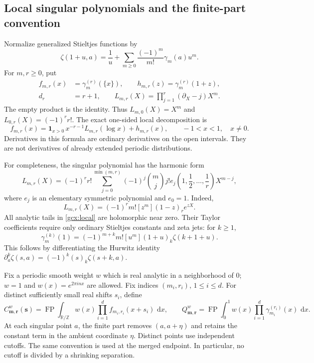 \documentclass[11pt]{article}
\numberwithin{equation}{section}
\theoremstyle{plain}
\theoremstyle{definition}
\theoremstyle{remark}
\DeclareMathOperator{\FP}{FP}
\newcommand{\R}{\mathbb R}
\newcommand{\Z}{\mathbb Z}
\newcommand{\dd}{\,\mathrm d}
\begin{document}
\subsection{Local singular polynomials and the finite-part convention}

Normalize generalized Stieltjes functions by
\[
 \zeta(1+u,a)=\frac1u+
       \sum_{m\ge0}\frac{(-1)^m}{m!}\gamma_m(a)u^m.
\]
For $m,r\ge0$, put
\begin{align}
 f_{m,r}(x)&=\gamma_m^{(r)}(\{x\}),\qquad
 h_{m,r}(z)=\gamma_m^{(r)}(1+z),\label{gcx:fg}\\
 d_r&=r+1,\qquad
 L_{m,r}(X)=\prod_{j=1}^{r}(\partial_X-j)X^m.
 \label{gcx:sing-polynomial}
\end{align}
The empty product is the identity.  Thus $L_{m,0}(X)=X^m$ and
$L_{0,r}(X)=(-1)^r r!$.  The exact one-sided local decomposition is
\begin{equation}\label{gcx:local}
 f_{m,r}(x)=\boldsymbol 1_{x>0}\,
              x^{-r-1}L_{m,r}(\log x)+h_{m,r}(x),
 \qquad -1<x<1,\quad x\ne0.
\end{equation}
Derivatives in this formula are ordinary derivatives on the open
intervals.  They are not derivatives of already extended periodic
distributions.

For completeness, the singular polynomial has the harmonic form
\begin{equation}\label{gcx:harmonic-poly}
 L_{m,r}(X)=(-1)^r r!
 \sum_{j=0}^{\min(m,r)}(-1)^j\binom mj j!
 e_j\left(1,\frac12,\ldots,\frac1r\right)X^{m-j},
\end{equation}
where $e_j$ is an elementary symmetric polynomial and $e_0=1$.
Indeed,
\[
 L_{m,r}(X)=(-1)^r m![z^m](1-z)_r e^{zX}.
\]
All analytic tails in \eqref{gcx:local} are holomorphic near zero.  Their
Taylor coefficients require only ordinary Stieltjes constants and zeta
jets: for $k\ge1$,
\begin{equation}\label{gcx:tail-derivative}
 \gamma_m^{(k)}(1)=(-1)^{m+k}m![u^m](1+u)_k\zeta(k+1+u).
\end{equation}
This follows by differentiating the Hurwitz identity
$\partial_a^k\zeta(s,a)=(-1)^k(s)_k\zeta(s+k,a)$.

Fix a periodic smooth weight $w$ which is real analytic in a neighborhood
of $0$; $w=1$ and $w(x)=e^{2\pi i n x}$ are allowed.  Fix indices
$(m_i,r_i)$, $1\le i\le d$.  For distinct sufficiently small real shifts
$s_i$, define
\begin{equation}\label{gcx:CQ}
 C_{\boldsymbol m,\boldsymbol r}^{w}(\boldsymbol s)
 =\FP\int_{\R/\Z} w(x)\prod_{i=1}^d f_{m_i,r_i}(x+s_i)\,\dd x,
 \qquad
 Q_{\boldsymbol m,\boldsymbol r}^{w}
 =\FP\int_0^1w(x)\prod_{i=1}^d\gamma_{m_i}^{(r_i)}(x)\,\dd x.
\end{equation}
At each singular point $a$, the finite part removes $(a,a+\eta)$ and
retains the constant term in the ambient coordinate $\eta$.  Distinct
points use independent cutoffs.  The same convention is used at the
merged endpoint.  In particular, no cutoff is divided by a shrinking
separation.
\end{document}
